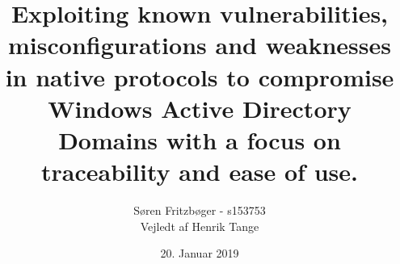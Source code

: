 
\usepackage{minted}



\usepackage{fancyhdr}
\usepackage{lastpage}

\pagestyle{fancy}
\fancyhf{}

\title{\LARGE Exploiting known vulnerabilities, misconfigurations and weaknesses in native protocols to compromise Windows Active Directory Domains with a focus on traceability and ease of use.}
\author{Søren Fritzbøger - s153753\\
Vejledt af Henrik Tange\\
}
\date{20. Januar 2019}



\gdef\BackMatter{
  \cleardoublepage
  \printbibliography[heading=bibintoc]
}

\usepackage[toc,page]{appendix}



\usepackage{csquotes}
\usepackage[english]{babel}

\addto\captionsenglish{%
  \renewcommand{\contentsname}%
    {Table of contents}%
}

\addto\captionsdanish{%
  \renewcommand{\contentsname}%
    {Indholdsfortegnelse}%
}

